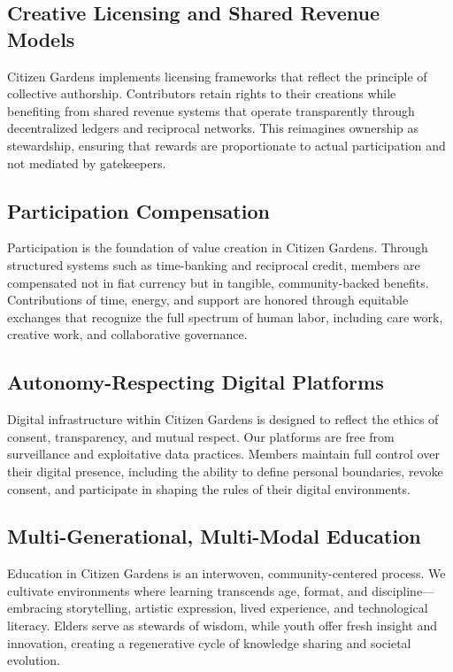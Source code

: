 \documentclass[12pt]{article}
\begin{document}
\subsection{Creative Licensing and Shared Revenue Models}

Citizen Gardens implements licensing frameworks that reflect the principle of collective authorship. Contributors retain rights to their creations while benefiting from shared revenue systems that operate transparently through decentralized ledgers and reciprocal networks. This reimagines ownership as stewardship, ensuring that rewards are proportionate to actual participation and not mediated by gatekeepers.

\subsection{Participation Compensation}

Participation is the foundation of value creation in Citizen Gardens. Through structured systems such as time-banking and reciprocal credit, members are compensated not in fiat currency but in tangible, community-backed benefits. Contributions of time, energy, and support are honored through equitable exchanges that recognize the full spectrum of human labor, including care work, creative work, and collaborative governance.

\subsection{Autonomy-Respecting Digital Platforms}

Digital infrastructure within Citizen Gardens is designed to reflect the ethics of consent, transparency, and mutual respect. Our platforms are free from surveillance and exploitative data practices. Members maintain full control over their digital presence, including the ability to define personal boundaries, revoke consent, and participate in shaping the rules of their digital environments.

\subsection{Multi-Generational, Multi-Modal Education}

Education in Citizen Gardens is an interwoven, community-centered process. We cultivate environments where learning transcends age, format, and discipline—embracing storytelling, artistic expression, lived experience, and technological literacy. Elders serve as stewards of wisdom, while youth offer fresh insight and innovation, creating a regenerative cycle of knowledge sharing and societal evolution.
\end{document}

